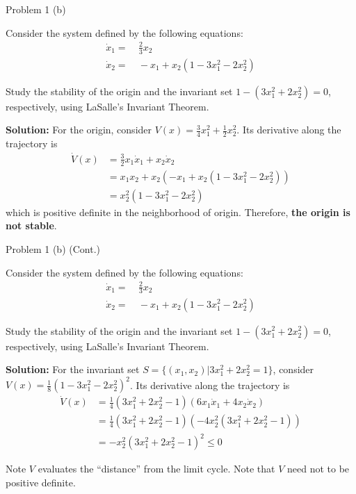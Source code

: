 \documentclass[8pt]{beamer}
\let\tempone\itemize
\let\temptwo\enditemize
\newenvironment{proitemize}{\vspace{-1em}\tempone}{\temptwo}%
\begin{document}
\begin{frame}[t]{Problem 1 (b)}%
  \begin{block}{}
  Consider the system defined by the following equations:
  \begin{align*}
    \dot x_1=&~\frac{2}{3}x_2\\
    \dot x_2=&~-x_1+x_2(1-3x_1^2-2x_2^2)
\end{align*}
  \begin{proitemize}
    \item[(b)] Study the stability of the origin and the invariant set $1-(3x_1^2+2x_2^2)=0$, respectively, using LaSalle's Invariant Theorem.
  \end{proitemize}
\end{block}
  {\bf Solution:}
  For the origin, consider $V(x)=\frac{3}{4}x_1^2+\frac{1}{2}x_2^2$. Its derivative along the trajectory is
  \begin{align*}
     \dot{V}(x)&=\frac{3}{2}x_1\dot{x}_1+x_2\dot{x}_2\\
     &=x_1x_2+x_2(-x_1+x_2(1-3x_1^2-2x_2^2)) \\
     &=x_2^2(1-3x_1^2-2x_2^2)
  \end{align*} 
  which is positive definite in the neighborhood of origin. Therefore, \textbf{the origin is not stable}.
\end{frame}

\begin{frame}[t]{Problem 1 (b) (Cont.)}%
  \begin{block}{}
  Consider the system defined by the following equations:
  \begin{align*}
    \dot x_1=&~\frac{2}{3}x_2\\
    \dot x_2=&~-x_1+x_2(1-3x_1^2-2x_2^2)
\end{align*}
  \begin{proitemize}
    \item[(b)] Study the stability of the origin and the invariant set $1-(3x_1^2+2x_2^2)=0$, respectively, using LaSalle's Invariant Theorem.
  \end{proitemize}
\end{block}
  {\bf Solution:} For the invariant set $S=\{(x_1,x_2)|3x_1^2+2x_2^2=1\}$, consider $V(x)=\frac{1}{8}(1-3x_1^2-2x_2^2)^2$. Its derivative along the trajectory is
  \begin{align*}
     \dot{V}(x)&=\frac{1}{4}(3x_1^2+2x_2^2-1)(6x_1\dot{x}_1+4x_2\dot{x}_2)\\
     &=\frac{1}{4}(3x_1^2+2x_2^2-1)(-4x_2^2(3x_1^2+2x_2^2-1)) \\
     &=-x_2^2(3x_1^2+2x_2^2-1)^2 \le 0 
  \end{align*} 
  \begin{block}{Note}
    $V$ evaluates the ``distance'' from the limit cycle. Note that $V$ need not to be positive definite. 
  \end{block}
\end{frame}
\end{document}
